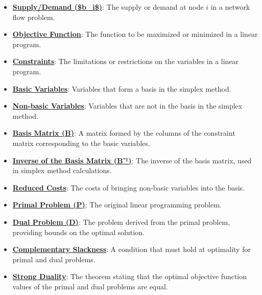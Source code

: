 \documentclass{article}%
\begin{document}
\begin{itemize}[leftmargin=*]
\item \href{https://www.math.purdue.edu/~yipn/421/2024-11-21-EconNetSimplex.pdf#page=1}{\textbf{Supply/Demand (\$b\_i\$)}}: The supply or demand at node $i$ in a network flow problem. %
\item \href{https://www.math.purdue.edu/~yipn/421/2024-11-21-EconNetSimplex.pdf#page=1}{\textbf{Objective Function}}: The function to be maximized or minimized in a linear program. %
\item \href{https://www.math.purdue.edu/~yipn/421/2024-11-21-EconNetSimplex.pdf#page=1}{\textbf{Constraints}}: The limitations or restrictions on the variables in a linear program. %
\item \href{https://www.math.purdue.edu/~yipn/421/2024-11-21-EconNetSimplex.pdf#page=2}{\textbf{Basic Variables}}: Variables that form a basis in the simplex method. %
\item \href{https://www.math.purdue.edu/~yipn/421/2024-11-21-EconNetSimplex.pdf#page=2}{\textbf{Non{-}basic Variables}}: Variables that are not in the basis in the simplex method. %
\item \href{https://www.math.purdue.edu/~yipn/421/2024-11-21-EconNetSimplex.pdf#page=7}{\textbf{Basis Matrix (B)}}: A matrix formed by the columns of the constraint matrix corresponding to the basic variables. %
\item \href{https://www.math.purdue.edu/~yipn/421/2024-11-21-EconNetSimplex.pdf#page=7}{\textbf{Inverse of the Basis Matrix (B⁻¹)}}: The inverse of the basis matrix, used in simplex method calculations. %
\item \href{https://www.math.purdue.edu/~yipn/421/2024-11-21-EconNetSimplex.pdf#page=7}{\textbf{Reduced Costs}}: The costs of bringing non-basic variables into the basis. %
\item \href{https://www.math.purdue.edu/~yipn/421/2024-11-21-EconNetSimplex.pdf#page=8}{\textbf{Primal Problem (P)}}: The original linear programming problem. %
\item \href{https://www.math.purdue.edu/~yipn/421/2024-11-21-EconNetSimplex.pdf#page=8}{\textbf{Dual Problem (D)}}: The problem derived from the primal problem, providing bounds on the optimal solution. %
\item \href{https://www.math.purdue.edu/~yipn/421/2024-11-21-EconNetSimplex.pdf#page=4}{\textbf{Complementary Slackness}}: A condition that must hold at optimality for primal and dual problems. %
\item \href{https://www.math.purdue.edu/~yipn/421/2024-11-21-EconNetSimplex.pdf#page=4}{\textbf{Strong Duality}}: The theorem stating that the optimal objective function values of the primal and dual problems are equal. %

\end{itemize}
\end{document}
